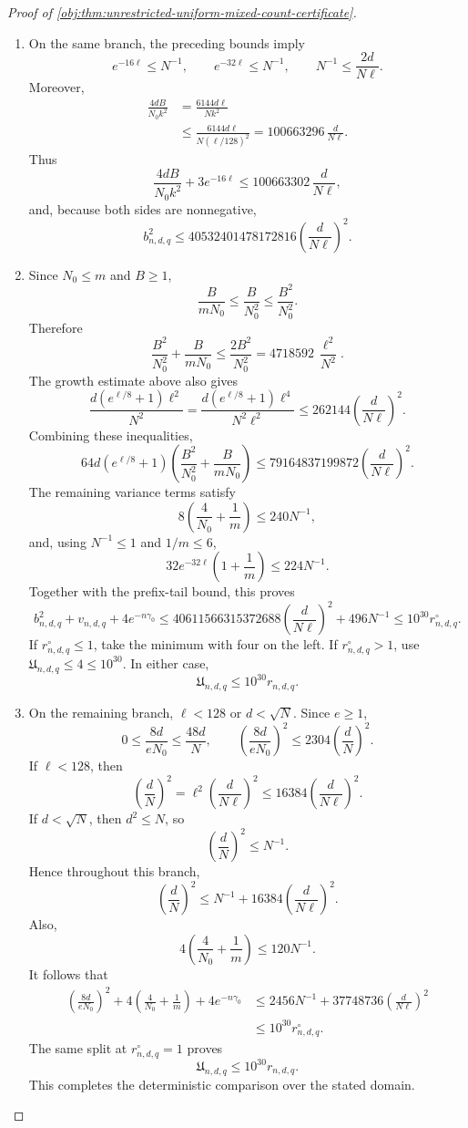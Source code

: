 \documentclass[11pt]{article}
\begin{document}
\begin{proof}[Proof of \cref{obj:thm:unrestricted-uniform-mixed-count-certificate}]
\begin{enumerate}
\item On the same branch, the preceding bounds imply
\[
e^{-16\ell}\le N^{-1},
\qquad e^{-32\ell}\le N^{-1},
\qquad N^{-1}\le\frac{2d}{N\ell}.
\]
Moreover,
\[
\begin{aligned}
\frac{4dB}{N_0k^2}
&=\frac{6144d\ell}{Nk^2}\\
&\le\frac{6144d\ell}{N(\ell/128)^2}
=100663296\,\frac{d}{N\ell}.
\end{aligned}
\]
Thus
\[
\frac{4dB}{N_0k^2}+3e^{-16\ell}
\le100663302\,\frac{d}{N\ell},
\]
and, because both sides are nonnegative,
\[
b_{n,d,q}^2
\le40532401478172816
\left(\frac{d}{N\ell}\right)^2.
\]

\item Since \(N_0\le m\) and \(B\ge1\),
\[
\frac{B}{mN_0}
\le\frac{B}{N_0^2}
\le\frac{B^2}{N_0^2}.
\]
Therefore
\[
\frac{B^2}{N_0^2}+\frac{B}{mN_0}
\le\frac{2B^2}{N_0^2}
=4718592\,\frac{\ell^2}{N^2}.
\]
The growth estimate above also gives
\[
\frac{d(e^{\ell/8}+1)\ell^2}{N^2}
=
\frac{d(e^{\ell/8}+1)\ell^4}{N^2\ell^2}
\le262144\left(\frac{d}{N\ell}\right)^2.
\]
Combining these inequalities,
\[
64d(e^{\ell/8}+1)
\left(\frac{B^2}{N_0^2}+\frac{B}{mN_0}\right)
\le79164837199872
\left(\frac{d}{N\ell}\right)^2.
\]
The remaining variance terms satisfy
\[
8\left(\frac4{N_0}+\frac1m\right)\le240N^{-1},
\]
and, using \(N^{-1}\le1\) and \(1/m\le6\),
\[
32e^{-32\ell}\left(1+\frac1m\right)\le224N^{-1}.
\]
Together with the prefix-tail bound, this proves
\[
b_{n,d,q}^2+v_{n,d,q}+4e^{-n\gamma_0}
\le40611566315372688
\left(\frac{d}{N\ell}\right)^2+496N^{-1}
\le10^{30}r^\circ_{n,d,q}.
\]
If \(r^\circ_{n,d,q}\le1\), take the minimum with four on the left.
If \(r^\circ_{n,d,q}>1\), use
\(\mathfrak U_{n,d,q}\le4\le10^{30}\). In either case,
\[
\mathfrak U_{n,d,q}\le10^{30}r_{n,d,q}.
\]

\item On the remaining branch, \(\ell<128\) or \(d<\sqrt N\). Since \(e\ge1\),
\[
0\le\frac{8d}{eN_0}\le\frac{48d}{N},
\qquad
\left(\frac{8d}{eN_0}\right)^2
\le2304\left(\frac dN\right)^2.
\]
If \(\ell<128\), then
\[
\left(\frac dN\right)^2
=\ell^2\left(\frac{d}{N\ell}\right)^2
\le16384\left(\frac{d}{N\ell}\right)^2.
\]
If \(d<\sqrt N\), then \(d^2\le N\), so
\[
\left(\frac dN\right)^2\le N^{-1}.
\]
Hence throughout this branch,
\[
\left(\frac dN\right)^2
\le N^{-1}+16384\left(\frac{d}{N\ell}\right)^2.
\]
Also,
\[
4\left(\frac4{N_0}+\frac1m\right)\le120N^{-1}.
\]
It follows that
\[
\begin{aligned}
\left(\frac{8d}{eN_0}\right)^2
+4\left(\frac4{N_0}+\frac1m\right)+4e^{-n\gamma_0}
&\le2456N^{-1}
+37748736\left(\frac{d}{N\ell}\right)^2\\
&\le10^{30}r^\circ_{n,d,q}.
\end{aligned}
\]
The same split at \(r^\circ_{n,d,q}=1\) proves
\[
\mathfrak U_{n,d,q}\le10^{30}r_{n,d,q}.
\]
This completes the deterministic comparison over the stated domain.


\end{enumerate}
\end{proof}
\end{document}
